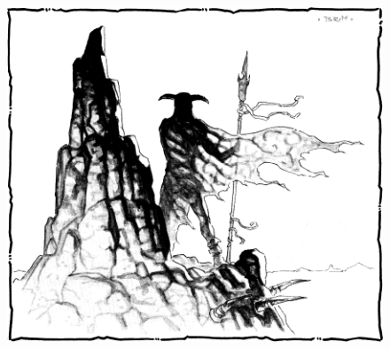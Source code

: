 \begin{figure}[t!]
\centering
\includegraphics[width=\textwidth]{images/adventurer-2.png}
\WOTC
\vskip5mm
\end{figure}


